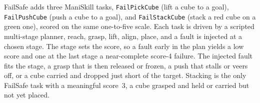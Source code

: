 FailSafe \citep{lin_failsafe_2025} adds three ManiSkill \citep{tao_maniskill3_2024} tasks, \texttt{FailPickCube} (lift a cube to a goal), \texttt{FailPushCube} (push a cube to a goal), and \texttt{FailStackCube} (stack a red cube on a green one), scored on the same one-to-five scale. Each task is driven by a scripted multi-stage planner, reach, grasp, lift, align, place, and a fault is injected at a chosen stage. The stage sets the score, so a fault early in the plan yields a low score and one at the last stage a near-complete score-4 failure. The injected fault fits the stage, a grasp that is then released or frozen, a push that stalls or veers off, or a cube carried and dropped just short of the target. Stacking is the only FailSafe task with a meaningful score~3, a cube grasped and held or carried but not yet placed.


